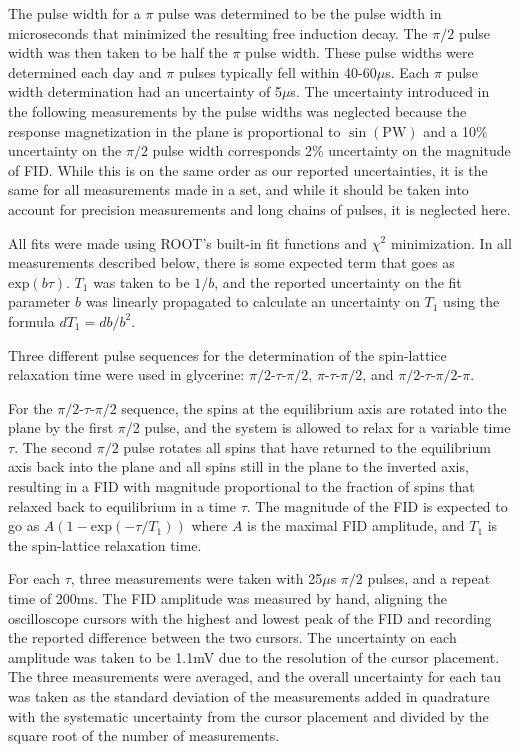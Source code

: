 The pulse width for a $\pi$ pulse was determined to be the pulse width in microseconds that minimized the resulting free induction decay. The $\pi/2$ pulse width was then taken to be half the $\pi$ pulse width. These pulse widths were determined each day and $\pi$ pulses typically fell within 40-60$\mu$s. Each $\pi$ pulse width determination had an uncertainty of 5$\mu$s. The uncertainty introduced in the following measurements by the pulse widths was neglected because the response magnetization in the plane is proportional to $\sin(\mathrm{PW})$ and a 10\% uncertainty on the $\pi/2$ pulse width corresponds 2\% uncertainty on the magnitude of FID. While this is on the same order as our reported uncertainties, it is the same for all measurements made in a set, and while it should be taken into account for precision measurements and long chains of pulses, it is neglected here.

All fits were made using ROOT's built-in fit functions and $\chi^2$ minimization. In all measurements described below, there is some expected term that goes as $\mathrm{exp}(b\tau)$. $T_{1}$ was taken to be $1/b$, and the reported uncertainty on the fit parameter $b$ was linearly propagated to calculate an uncertainty on $T_{1}$ using the formula $dT_{1}=db/b^{2}$.

Three different pulse sequences for the determination of the spin-lattice relaxation time were used in glycerine: $\pi/2$-$\tau$-$\pi/2$, $\pi$-$\tau$-$\pi/2$, and $\pi/2$-$\tau$-$\pi/2$-$\pi$. 

For the $\pi/2$-$\tau$-$\pi/2$ sequence, the spins at the equilibrium axis are rotated into the plane by the first $\pi$/2 pulse, and the system is allowed to relax for a variable time $\tau$. The second $\pi/2$ pulse rotates all spins that have returned to the equilibrium axis back into the plane and all spins still in the plane to the inverted axis, resulting in a FID with magnitude proportional to the fraction of spins that relaxed back to equilibrium in a time $\tau$. The magnitude of the FID is expected to go as $A(1-\mathrm{exp}(-\tau/T_{1}))$ where $A$ is the maximal FID amplitude, and $T_{1}$ is the spin-lattice relaxation time.

For each $\tau$, three measurements were taken with 25$\mu$s $\pi/2$ pulses, and a repeat time of 200ms. The FID amplitude was measured by hand, aligning the oscilloscope cursors with the highest and lowest peak of the FID and recording the reported difference between the two cursors. The uncertainty on each amplitude was taken to be 1.1mV due to the resolution of the cursor placement. The three measurements were averaged, and the overall uncertainty for each tau was taken as the standard deviation of the measurements added in quadrature with the systematic uncertainty from the cursor placement and divided by the square root of the number of measurements. 

